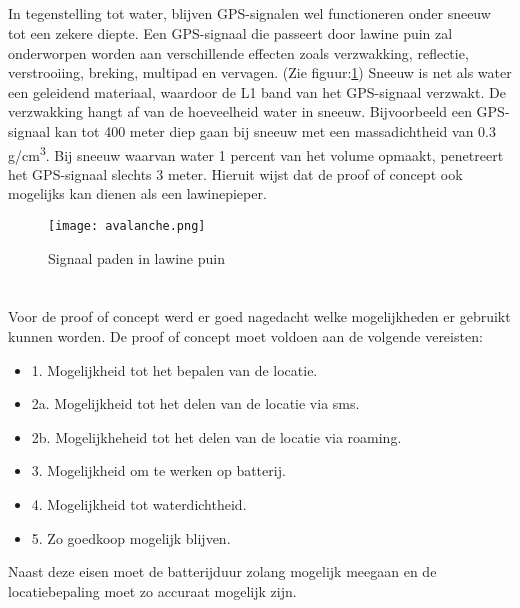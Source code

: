 \subsection{}
In tegenstelling tot water, blijven GPS-signalen wel functioneren onder sneeuw tot een zekere diepte. Een GPS-signaal die passeert door lawine puin zal onderworpen worden aan verschillende effecten zoals verzwakking, reflectie, verstrooiing, breking, multipad en vervagen. (Zie figuur:\ref{fig:avalanche}) Sneeuw is net als water een geleidend materiaal, waardoor de L1 band van het GPS-signaal verzwakt. De verzwakking hangt af van de hoeveelheid water in sneeuw. Bijvoorbeeld een GPS-signaal kan tot 400 meter diep gaan bij sneeuw met een massadichtheid van 0.3 g/cm\textsuperscript{3}. Bij sneeuw waarvan water 1 percent van het volume opmaakt, penetreert het GPS-signaal slechts 3 meter.
\autocite{avalanche_gps} Hieruit wijst dat de proof of concept ook mogelijks kan dienen als een lawinepieper. 
\begin{figure}
    \texttt{[image: avalanche.png]}
    \caption{Signaal paden in lawine puin}
    \cite{avalanche_gps}
    \label{fig:avalanche}
\end{figure}
\pagebreak
\section{}
Voor de proof of concept werd er goed nagedacht welke mogelijkheden er gebruikt kunnen worden. De proof of concept moet voldoen aan de volgende vereisten:
\begin{itemize}
    \item 1. Mogelijkheid tot het bepalen van de locatie.
    \item 2a. Mogelijkheid tot het delen van de locatie via sms.
    \item 2b. Mogelijkheheid tot het delen van de locatie via roaming.
    \item 3. Mogelijkheid om te werken op batterij.
    \item 4. Mogelijkheid tot waterdichtheid.
    \item 5. Zo goedkoop mogelijk blijven.
\end{itemize}
Naast deze eisen moet de batterijduur zolang mogelijk meegaan en de locatiebepaling moet zo accuraat mogelijk zijn.

